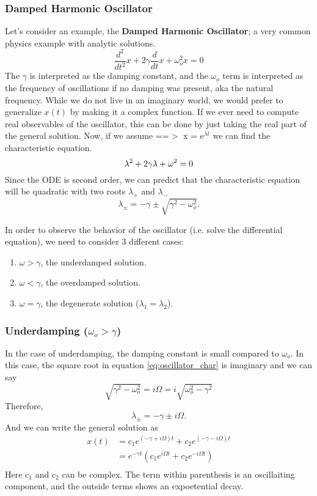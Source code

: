 \documentclass{article}
\newcommand{\be}{\begin{equation}}
\newcommand{\ee}{\end{equation}}
\newcommand{\benum}{\begin{enumerate}}
\newcommand{\eenum}{\end{enumerate}}
\begin{document}
\subsubsection*{Damped Harmonic Oscillator}
Let's consider an example, the \textbf{Damped Harmonic Oscillator}; a very common physics example with analytic solutions.
\be
\frac{d^2}{dt^2} x + 2\gamma \frac{d}{dt} x + \omega_o^2 x = 0
\ee
The $\gamma$ is interpreted as the damping constant, and the $\omega_o$ term is interpreted as the frequency of oscillations if no damping was present, aka the natural frequency.
While we do not live in an imaginary world, we would prefer to generalize $x(t)$ by making it a complex function.
If we ever need to compute real observables of the oscillator, this can be done by just taking the real part of the general solution.
Now, if we assume ==$>$ x = e$^{\lambda t}$ we can find the characteristic equation.
\be
\lambda^2 + 2\gamma\lambda  + \omega^2 = 0\\
\ee
Since the ODE is second order, we can predict that the characteristic equation will be quadratic with two roots $\lambda_+$ and $\lambda_-$
\be \label{eq:oscillator_char}
\lambda_{\pm} = -\gamma \pm \sqrt{\gamma^2 - \omega_o^2} .
\ee

In order to observe the behavior of the oscillator (i.e. solve the differential equation), we need to consider 3 different cases:
\benum
\item $\omega > \gamma$, the underdamped solution.
\item $\omega < \gamma$, the overdamped solution.
\item $\omega = \gamma$, the degenerate solution ($\lambda_1 = \lambda_2$).
\eenum

\subsubsection*{Underdamping ($\omega_o > \gamma$)}
In the case of underdamping, the damping constant is small compared to $\omega_o$. In this case, the square root in equation \ref{eq:oscillator_char} is imaginary and we can say
\be
\sqrt{\gamma^2 - \omega_o^2} = i \Omega = i \sqrt{\omega_o^2 - \gamma^2}
\ee
Therefore,
\be
\lambda_{\pm} = -\gamma \pm i \Omega .
\ee
And we can write the general solution as
\be
\begin{split}
x(t) &= c_1 e^{(-\gamma + i \Omega)t} + c_2 e^{(-\gamma - i \Omega)t} \\
&= e^{-\gamma t}(c_1 e^{i \Omega t} + c_2 e^{-i \Omega t}) \\
\end{split}
\ee
Here c$_1$ and c$_2$ can be complex.
The term within parenthesis is an oscillaiting component, and the outside terms shows an expoetential decay. 
\end{document}
